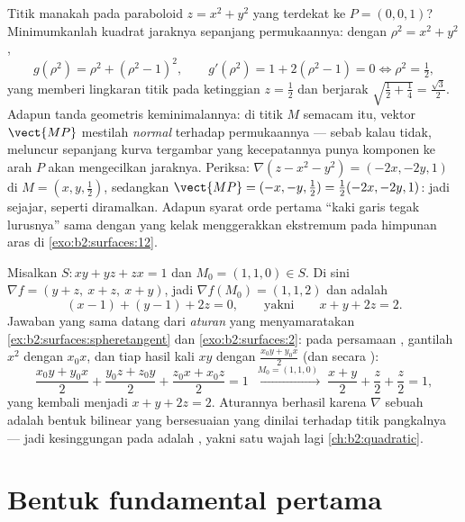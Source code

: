 \begin{example}\label{ex:b2:surfaces:closest}
Titik manakah pada paraboloid $z = x^2 + y^2$ yang terdekat ke
$P = (0, 0, 1)$? Minimumkanlah kuadrat jaraknya sepanjang
permukaannya: dengan $\rho^2 = x^2 + y^2$,
\[
g(\rho^2) = \rho^2 + (\rho^2 - 1)^2,
\qquad
g'(\rho^2) = 1 + 2(\rho^2 - 1) = 0
\iff \rho^2 = \tfrac12 ,
\]
yang memberi lingkaran titik pada ketinggian $z = \frac12$ dan
berjarak $\sqrt{\tfrac12 + \tfrac14} = \frac{\sqrt3}2$. Adapun
tanda geometris keminimalannya: di titik $M$ semacam itu,
vektor $\vect{MP}$ mestilah \emph{normal} terhadap permukaannya ---
sebab kalau tidak, meluncur sepanjang kurva tergambar yang kecepatannya punya
komponen ke arah $P$ akan mengecilkan jaraknya. Periksa:
$\nabla(z - x^2 - y^2) = (-2x, -2y, 1)$ di $M = (x, y,
\tfrac12)$, sedangkan $\vect{MP} = (-x, -y, \tfrac12) =
\tfrac12(-2x, -2y, 1)$: jadi sejajar, seperti diramalkan. Adapun
syarat orde pertama ``kaki garis tegak lurusnya'' sama dengan
yang kelak menggerakkan ekstremum pada himpunan aras di
\cref{exo:b2:surfaces:12}.
\end{example}

\begin{example}\label{ex:b2:surfaces:polarization}
Misalkan $S : xy + yz + zx = 1$ dan $M_0 = (1, 1, 0) \in S$. Di sini
$\nabla f = (y + z,\ x + z,\ x + y)$, jadi $\nabla f(M_0) = (1,
1, 2)$ dan  adalah
\[
(x - 1) + (y - 1) + 2z = 0,
\qquad\text{yakni}\qquad x + y + 2z = 2 .
\]
Jawaban yang sama datang dari \emph{aturan } yang
menyamaratakan \cref{ex:b2:surfaces:spheretangent} dan
\cref{exo:b2:surfaces:2}: pada persamaan , gantilah
$x^2$ dengan $x_0x$, dan tiap hasil kali $xy$ dengan $\frac{x_0y +
y_0x}2$ (dan secara ):
\[
\frac{x_0y + y_0x}2 + \frac{y_0z + z_0y}2 + \frac{z_0x +
x_0z}2 = 1
\;\xrightarrow{\ M_0 = (1,1,0)\ }\;
\frac{x + y}2 + \frac z2 + \frac z2 = 1 ,
\]
yang kembali menjadi $x + y + 2z = 2$. Aturannya berhasil karena
$\nabla$ sebuah  adalah bentuk bilinear yang bersesuaian
yang dinilai terhadap titik pangkalnya --- jadi kesinggungan pada  adalah
, yakni satu wajah lagi \cref{ch:b2:quadratic}.
\end{example}

\section{Bentuk fundamental pertama}

